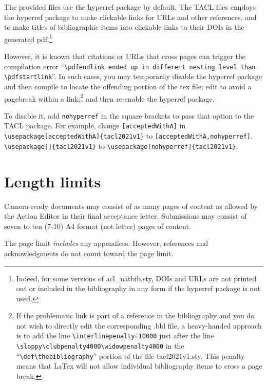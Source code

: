\documentclass[11pt,a4paper]{article}
\newcommand{\styleFileVersion}{tacl2021v1}
\begin{document}
The provided files use the hyperref package by default. The TACL files
employs the hyperref package to make clickable links for URLs and other references,
and to make titles of bibliographic items into clickable links to their DOIs
in the generated pdf.\footnote{Indeed, for some versions of acl\_natbib.sty,
DOIs and URLs are not printed out or included in the bibliography in any form
if the hyperref package is not used.}

However, it is known that citations or URLs that cross pages can trigger the
compilation error ``{\tt {\textbackslash}pdfendlink ended up in different nesting
level than {\textbackslash}pdfstartlink}''.  In such cases, you may temporarily
disable the hyperref package and then compile to locate the offending portion of
the tex file; edit to avoid a pagebreak within a link;\footnote{If the problematic
link is part of a reference in the bibliography and you do not wish to
directly edit the corresponding .bbl file, a heavy-handed approach is to
add the line
{\tt \textbackslash interlinepenalty=10000}
just after the line
{\tt \textbackslash sloppy\textbackslash clubpenalty4000\textbackslash widowpenalty4000} in the
``{\tt \textbackslash def\textbackslash thebibliography}'' portion
of the file \styleFileVersion.sty.  This penalty means that LaTex will not allow
individual bibliography items to cross a page break.
}
 and then re-enable the
hyperref package.

To disable it,
add {\tt nohyperref} in the square brackets to pass that option to the TACL package.
For example, change
\iftaclpubformat
\verb+[acceptedWithA]+ in
{\footnotesize {\tt {\textbackslash usepackage}[acceptedWithA]\{\styleFileVersion\}}}
to
\verb+[acceptedWithA,nohyperref]+.
\else
{\tt {\textbackslash usepackage}[]\{\styleFileVersion\}}
to
{\tt {\textbackslash usepackage}[nohyperref]\{\styleFileVersion\}}.
\fi



\section{Length limits}
\label{sec:length}

\iftaclpubformat
Camera-ready documents may consist of as many pages of content as allowed by
the Action Editor in their final acceptance letter.
\else
Submissions may consist of seven to ten (7-10) A4 format (not letter) pages of
content.
\fi

The page limit \emph{includes} any appendices. However, references
\iftaclpubformat
and acknowledgments
\fi
do not count
toward the page limit.
\end{document}
